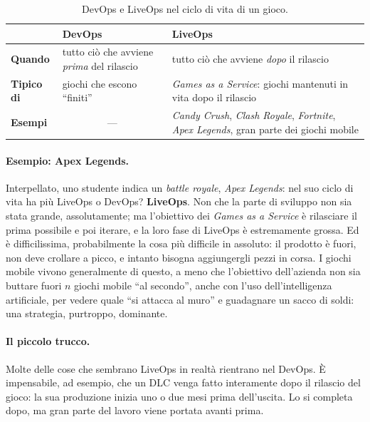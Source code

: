 \begin{table}[htbp]
  \centering
  \begin{tabular}{@{}p{}p{}p{}@{}}
    \toprule
    & \textbf{DevOps} & \textbf{LiveOps} \\
    \midrule
    \textbf{Quando} & tutto ciò che avviene \emph{prima} del rilascio
                    & tutto ciò che avviene \emph{dopo} il rilascio \\
    \addlinespace
    \textbf{Tipico di} & giochi che escono ``finiti''
                       & \emph{Games as a Service}: giochi mantenuti in vita
                         dopo il rilascio \\
    \addlinespace
    \textbf{Esempi} & \multicolumn{1}{c}{---}
                    & \emph{Candy Crush}, \emph{Clash Royale},
                      \emph{Fortnite}, \emph{Apex Legends}, gran parte dei
                      giochi mobile \\
    \bottomrule
  \end{tabular}
  \caption{DevOps e LiveOps nel ciclo di vita di un gioco.}
  \label{tab:devops-liveops}
\end{table}

\paragraph{Esempio: Apex Legends.} Interpellato, uno studente indica un
\emph{battle royale}, \emph{Apex Legends}: nel suo ciclo di vita ha più
LiveOps o DevOps? \textbf{LiveOps}. Non che la parte di sviluppo non sia stata
grande, assolutamente; ma l'obiettivo dei \emph{Games as a Service} è
rilasciare il prima possibile e poi iterare, e la loro fase di LiveOps è
estremamente grossa. Ed è difficilissima, probabilmente la cosa più difficile
in assoluto: il prodotto è fuori, non deve crollare a picco, e intanto bisogna
aggiungergli pezzi in corsa. I giochi mobile vivono generalmente di questo, a
meno che l'obiettivo dell'azienda non sia buttare fuori $n$ giochi mobile ``al
secondo'', anche con l'uso dell'intelligenza artificiale, per vedere quale
``si attacca al muro'' e guadagnare un sacco di soldi: una strategia,
purtroppo, dominante.

\paragraph{Il piccolo trucco.} Molte delle cose che sembrano LiveOps in
realtà rientrano nel DevOps. È impensabile, ad esempio, che un DLC venga fatto
interamente dopo il rilascio del gioco: la sua produzione inizia uno o due
mesi prima dell'uscita. Lo si completa dopo, ma gran parte del lavoro viene
portata avanti prima.

